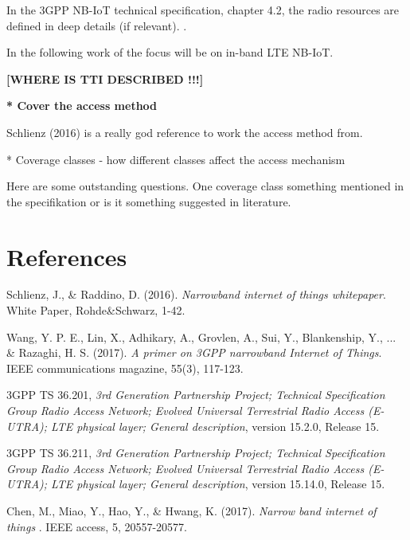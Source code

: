 \documentclass[10pt,a4paper,titlepage,twoside]{article}
\newcommand{\note}[1]{\textbf{\color{ymagray}[#1]}}
\newcommand{\point}[1]{\textbf{\color{ymared} #1}}
\begin{document}
In the 3GPP NB-IoT technical specification, chapter 4.2, the radio resources are defined in deep details (if relevant).
\cite{schlienz}.

In the following work of the focus will be on in-band LTE NB-IoT.

\note{WHERE IS TTI DESCRIBED !!!}

\point{* Cover the access method}

Schlienz (2016) is a really god reference to work the access method from.

* Coverage classes - how different classes affect the access mechanism

Here are some outstanding questions. One coverage class something mentioned in the specifikation or is it something suggested in literature.


\clearpage
\section{References}

\begin{thebibliography}{4}
Schlienz, J., \& Raddino, D. (2016).
\textit{Narrowband internet of things whitepaper}. White Paper, Rohde\&Schwarz, 1-42.

Wang, Y. P. E., Lin, X., Adhikary, A., Grovlen, A., Sui, Y., Blankenship, Y., ... \& Razaghi, H. S. (2017).
\textit{A primer on 3GPP narrowband Internet of Things}. IEEE communications magazine, 55(3), 117-123.

3GPP TS 36.201,
\textit{3rd Generation Partnership Project; Technical Specification Group Radio Access Network; Evolved Universal Terrestrial Radio Access (E-UTRA); LTE physical layer; General description}, version 15.2.0, Release 15.

3GPP TS 36.211,
\textit{3rd Generation Partnership Project; Technical Specification Group Radio Access Network; Evolved Universal Terrestrial Radio Access (E-UTRA); LTE physical layer; General description}, version 15.14.0, Release 15.

Chen, M., Miao, Y., Hao, Y., \& Hwang, K. (2017).
\textit{Narrow band internet of things}
. IEEE access, 5, 20557-20577.

\end{thebibliography}
\end{document}
